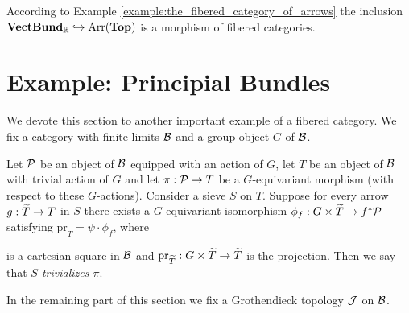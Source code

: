 \begin{example}
\begin{center}
\end{center}
According to Example \ref{example:the_fibered_category_of_arrows} the inclusion $\mathbf{VectBund}_{{\mathbb R}}\hookrightarrow \mathrm{Arr}(\mathbf{Top})$ is a morphism of fibered categories.
\end{example}

\section{Example: Principial Bundles}
\noindent
We devote this section to another important example of a fibered category. We fix a category with finite limits ${\mathcal B}$ and a group object $G$ of ${\mathcal B}$.

\begin{definition}
Let ${\mathcal P}$ be an object of ${\mathcal B}$ equipped with an action of $G$, let $T$ be an object of ${\mathcal B}$ with trivial action of $G$ and let $\pi:{\mathcal P}\rightarrow T$ be a $G$-equivariant morphism (with respect to these $G$-actions). Consider a sieve $S$ on $T$. Suppose for every arrow $g:\widetilde{T}\rightarrow T$ in $S$ there exists a $G$-equivariant isomorphism $\phi_f:G\times \widetilde{T}\rightarrow f^*{\mathcal P}$ satisfying $\mathrm{pr}_{\widetilde{T}} = \psi\cdot \phi_f$, where
\begin{center}
\end{center}
is a cartesian square in ${\mathcal B}$ and $\mathrm{pr}_{\widetilde{T}}:G\times \widetilde{T} \rightarrow \widetilde{T}$ is the projection. Then we say that \textit{$S$ trivializes $\pi$}.
\end{definition}
\noindent
In the remaining part of this section we fix a Grothendieck topology ${\mathcal J}$ on ${\mathcal B}$.

